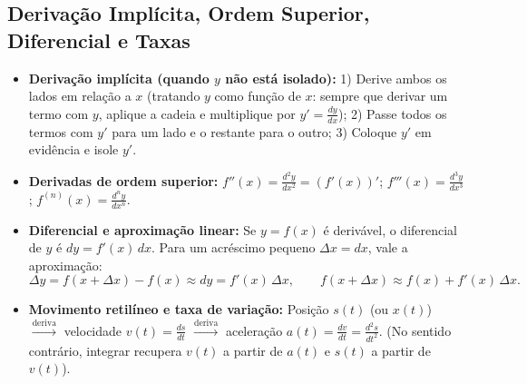 \documentclass[10pt,a4paper]{article}
\begin{document}
\subsection{Derivação Implícita, Ordem Superior, Diferencial e Taxas}
\begin{itemize}
    \item \textbf{Derivação implícita (quando $y$ não está isolado):}
          1) Derive ambos os lados em relação a $x$ (tratando $y$ como função de $x$: sempre que derivar um termo com $y$, aplique a cadeia e multiplique por $y' = \frac{dy}{dx}$);
          2) Passe todos os termos com $y'$ para um lado e o restante para o outro;
          3) Coloque $y'$ em evidência e isole $y'$.
    \item \textbf{Derivadas de ordem superior:}
          $f''(x) = \frac{d^2y}{dx^2} = (f'(x))'$; \quad $f'''(x) = \frac{d^3y}{dx^3}$; \quad $f^{(n)}(x) = \frac{d^ny}{dx^n}$.
    \item \textbf{Diferencial e aproximação linear:}
          Se $y = f(x)$ é derivável, o diferencial de $y$ é $\displaystyle dy = f'(x)\,dx$.
          Para um acréscimo pequeno $\Delta x = dx$, vale a aproximação:
          \[
              \Delta y = f(x + \Delta x) - f(x) \approx dy = f'(x)\,\Delta x, \qquad f(x + \Delta x) \approx f(x) + f'(x)\,\Delta x.
          \]
    \item \textbf{Movimento retilíneo e taxa de variação:}
          Posição $s(t)$ (ou $x(t)$) $\xrightarrow{\text{deriva}}$ velocidade $\displaystyle v(t) = \frac{ds}{dt}$ $\xrightarrow{\text{deriva}}$ aceleração $\displaystyle a(t) = \frac{dv}{dt} = \frac{d^2s}{dt^2}$.
          (No sentido contrário, integrar recupera $v(t)$ a partir de $a(t)$ e $s(t)$ a partir de $v(t)$).
\end{itemize}
\end{document}

